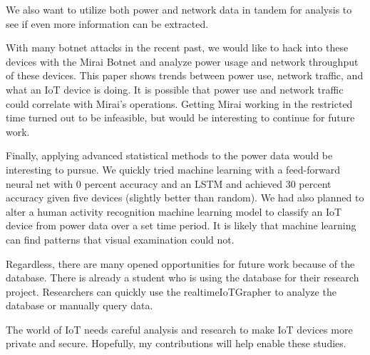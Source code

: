We also want to utilize both power and network data in tandem for analysis to see if even more information can be extracted.

With many botnet attacks in the recent past, we would like to hack into these devices with the Mirai Botnet and analyze power usage and network throughput of these devices. This paper shows trends between power use, network traffic, and what an IoT device is doing. It is possible that power use and network traffic could correlate with Mirai's operations. Getting Mirai working in the restricted time turned out to be infeasible, but would be interesting to continue for future work.

Finally, applying advanced statistical methods to the power data would be interesting to pursue. We quickly tried machine learning with a feed-forward neural net with 0 percent accuracy and an LSTM and achieved 30 percent accuracy given five devices (slightly better than random). We had also planned to alter a human activity recognition machine learning model to classify an IoT device from power data over a set time period. It is likely that machine learning can find patterns that visual examination could not.

Regardless, there are many opened opportunities for future work because of the database. There is already a student who is using the database for their research project. Researchers can quickly use the realtimeIoTGrapher to analyze the database or manually query data.

The world of IoT needs careful analysis and research to make IoT devices more private and secure. Hopefully, my contributions will help enable these studies.